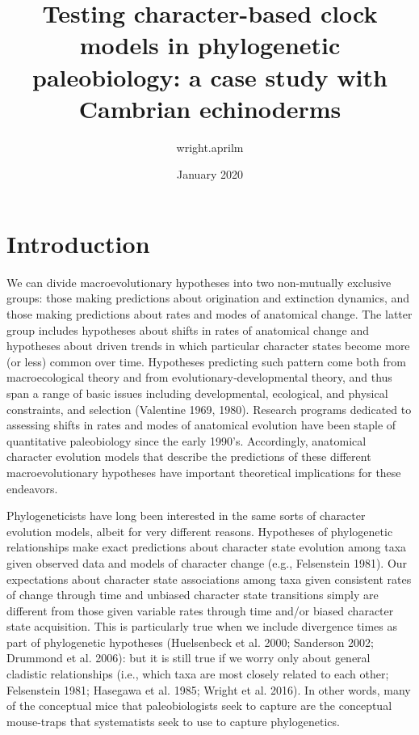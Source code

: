 \documentclass{article}
\title{Testing character-based clock models in phylogenetic paleobiology: a case study with Cambrian echinoderms}
\author{wright.aprilm }
\date{January 2020}
\newcommand{\amw}[1]{{\textcolor{ForestGreen}{AW: #1}}} %
\begin{document}
\maketitle


\section{Introduction}

We can divide macroevolutionary hypotheses into two non-mutually exclusive groups: those making predictions about origination and extinction dynamics, and those making predictions about rates and modes of anatomical change. 
The latter group includes hypotheses about shifts in rates of anatomical change and hypotheses about driven trends in which particular character states become more (or less) common over time.  
Hypotheses predicting such pattern come both from macroecological theory and from evolutionary‑developmental theory, and thus span a range of basic issues including developmental, ecological, and physical constraints, and selection (Valentine 1969, 1980). 
Research programs dedicated to assessing shifts in rates and modes of anatomical evolution have been staple of quantitative paleobiology since the early 1990’s. 
Accordingly, anatomical character evolution models that describe the predictions of these different macroevolutionary hypotheses have important theoretical implications for these endeavors. %

Phylogeneticists have long been interested in the same sorts of character evolution models, albeit for very different reasons.  
Hypotheses of phylogenetic relationships make exact predictions about character state evolution among taxa given observed data and models of character change (e.g., Felsenstein 1981).  
Our expectations about character state associations among taxa given consistent rates of change through time and unbiased character state transitions simply are different from those given variable rates through time and/or biased character state acquisition.  
This is particularly true when we include divergence times as part of phylogenetic hypotheses (Huelsenbeck et al. 2000; Sanderson 2002; Drummond et al. 2006): but it is still true if we worry only about general cladistic relationships (i.e., which taxa are most closely related to each other; Felsenstein 1981; Hasegawa et al. 1985; Wright et al. 2016).  
In other words, many of the conceptual mice that paleobiologists seek to capture are the conceptual mouse-traps that systematists seek to use to capture phylogenetics.  
\end{document}

